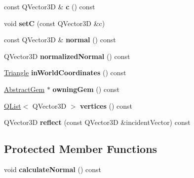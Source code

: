 \begin{DoxyCompactItemize}
\item 
\hypertarget{class_triangle_a61f6c0245df276555de6d1b1a98840b8}{}const Q\+Vector3\+D \& {\bfseries c} () const \label{class_triangle_a61f6c0245df276555de6d1b1a98840b8}

\item 
\hypertarget{class_triangle_af4566995b306c0f9ae72b457b7acb983}{}void {\bfseries set\+C} (const Q\+Vector3\+D \&c)\label{class_triangle_af4566995b306c0f9ae72b457b7acb983}

\item 
\hypertarget{class_triangle_aa1ccf6af0c2567e53b9dc6f51243f934}{}const Q\+Vector3\+D \& {\bfseries normal} () const \label{class_triangle_aa1ccf6af0c2567e53b9dc6f51243f934}

\item 
\hypertarget{class_triangle_ad51139a1ad219f93031cf1a64646c123}{}Q\+Vector3\+D {\bfseries normalized\+Normal} () const \label{class_triangle_ad51139a1ad219f93031cf1a64646c123}

\item 
\hypertarget{class_triangle_ad29fe2cad14c0285aca2557d3a0c0f13}{}\hyperlink{class_triangle}{Triangle} {\bfseries in\+World\+Coordinates} () const \label{class_triangle_ad29fe2cad14c0285aca2557d3a0c0f13}

\item 
\hypertarget{class_triangle_ae531defb56fd5b0a19078f23954253dc}{}\hyperlink{class_abstract_gem}{Abstract\+Gem} $\ast$ {\bfseries owning\+Gem} () const \label{class_triangle_ae531defb56fd5b0a19078f23954253dc}

\item 
\hypertarget{class_triangle_a66da12d2c747c435ea5148df472d9229}{}\hyperlink{class_q_list}{Q\+List}$<$ Q\+Vector3\+D $>$ {\bfseries vertices} () const \label{class_triangle_a66da12d2c747c435ea5148df472d9229}

\item 
\hypertarget{class_triangle_a4fb81ac7e355c97a03f4c056bd79ac99}{}Q\+Vector3\+D {\bfseries reflect} (const Q\+Vector3\+D \&incident\+Vector) const \label{class_triangle_a4fb81ac7e355c97a03f4c056bd79ac99}

\end{DoxyCompactItemize}
\subsection*{Protected Member Functions}
\begin{DoxyCompactItemize}
\item 
\hypertarget{class_triangle_a429f86c999f5c27720f7b912fa3b20ca}{}void {\bfseries calculate\+Normal} () const \label{class_triangle_a429f86c999f5c27720f7b912fa3b20ca}

\end{DoxyCompactItemize}
